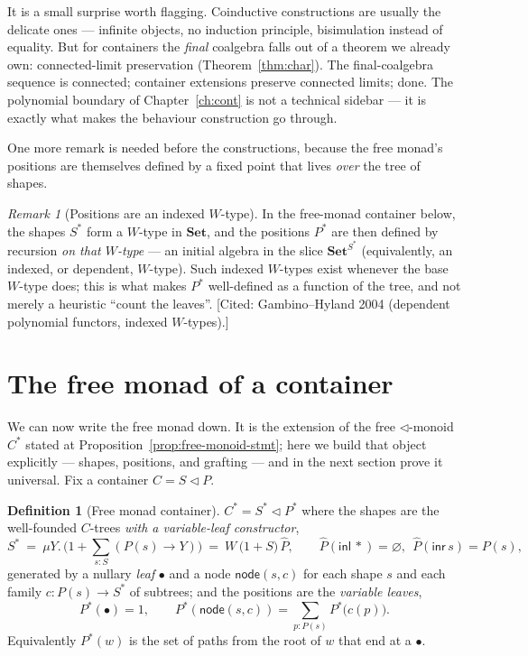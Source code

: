 \documentclass[11pt,a4paper]{book}
\newcommand{\Set}{\mathbf{Set}}
\newcommand{\cont}[2]{#1 \triangleleft #2}
\theoremstyle{plain}
\theoremstyle{definition}
\newtheorem{Definition}[Theorem]{Definition}
\theoremstyle{remark}
\newtheorem{Remark}[Theorem]{Remark}
\newcommand{\prov}[1]{\hfill\textsf{\footnotesize[#1]}}
\begin{document}
\begin{teachbox}
It is a small surprise worth flagging. Coinductive constructions are usually the delicate
ones --- infinite objects, no induction principle, bisimulation instead of equality. But for
containers the \emph{final} coalgebra falls out of a theorem we already own: connected-limit
preservation (Theorem~\ref{thm:char}). The final-coalgebra sequence is connected; container
extensions preserve connected limits; done. The polynomial boundary of Chapter~\ref{ch:cont}
is not a technical sidebar --- it is exactly what makes the behaviour construction go through.
\end{teachbox}

One more remark is needed before the constructions, because the free monad's positions are
themselves defined by a fixed point that lives \emph{over} the tree of shapes.

\begin{Remark}[Positions are an indexed $W$-type]\label{rem:indexed-w}
In the free-monad container below, the shapes $S^{*}$ form a $W$-type in $\Set$, and the
positions $P^{*}$ are then defined by recursion \emph{on that $W$-type} --- an initial algebra
in the slice $\Set^{S^{*}}$ (equivalently, an indexed, or dependent, $W$-type). Such
indexed $W$-types exist whenever the base $W$-type does; this is what makes $P^{*}$
well-defined as a function of the tree, and not merely a heuristic ``count the leaves''.
\prov{Cited: Gambino--Hyland 2004 (dependent polynomial functors, indexed $W$-types).}
\end{Remark}

\section{The free monad of a container}
\label{sec:moncomon-free}

We can now write the free monad down. It is the extension of the free
$\triangleleft$-monoid $C^{*}$ stated at Proposition~\ref{prop:free-monoid-stmt}; here we build
that object explicitly --- shapes, positions, and grafting --- and in the next section prove it
universal. Fix a container $C=\cont SP$.

\begin{Definition}[Free monad container]\label{def:freemonad}
$C^{*}=\cont{S^{*}}{P^{*}}$ where the shapes are the well-founded $C$-trees \emph{with a
variable-leaf constructor},
\[
  S^{*}\ =\ \mu Y.\,\bigl(1+\textstyle\sum_{s:S}(P(s)\to Y)\bigr)
  \ =\ W\,\bigl(1+S\bigr)\,\widehat P,
  \qquad
  \widehat P(\mathsf{inl}\,\ast)=\varnothing,\ \ \widehat P(\mathsf{inr}\,s)=P(s),
\]
generated by a nullary \emph{leaf} $\bullet$ and a node $\mathsf{node}(s,c)$ for each shape
$s$ and each family $c\colon P(s)\to S^{*}$ of subtrees; and the positions are the
\emph{variable leaves},
\[
  P^{*}(\bullet)=1,\qquad
  P^{*}(\mathsf{node}(s,c))=\textstyle\sum_{p:P(s)}P^{*}\!\bigl(c(p)\bigr).
\]
Equivalently $P^{*}(w)$ is the set of paths from the root of $w$ that end at a $\bullet$.
\end{Definition}
\end{document}

